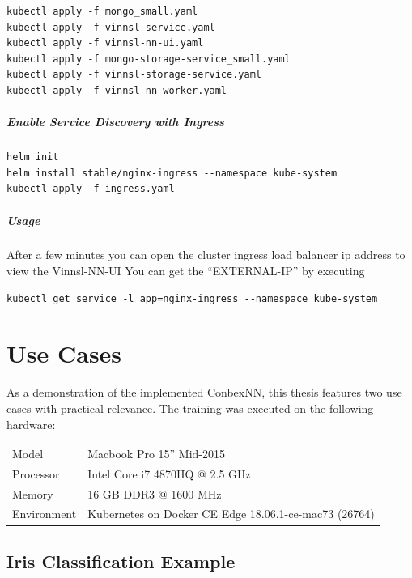 \begin{verbatim}
kubectl apply -f mongo_small.yaml
kubectl apply -f vinnsl-service.yaml
kubectl apply -f vinnsl-nn-ui.yaml
kubectl apply -f mongo-storage-service_small.yaml 
kubectl apply -f vinnsl-storage-service.yaml
kubectl apply -f vinnsl-nn-worker.yaml
\end{verbatim}

\paragraph{Enable Service Discovery with
Ingress}\label{enable-service-discovery-with-ingress}

\begin{verbatim}
helm init
helm install stable/nginx-ingress --namespace kube-system 
kubectl apply -f ingress.yaml
\end{verbatim}

\paragraph{Usage}\label{usage-1}

After a few minutes you can open the cluster ingress load balancer ip
address to view the Vinnsl-NN-UI You can get the ``EXTERNAL-IP'' by
executing

\begin{verbatim}
kubectl get service -l app=nginx-ingress --namespace kube-system
\end{verbatim}

\chapter{Use Cases}\label{use-cases}

As a demonstration of the implemented ConbexNN, this thesis features two
use cases with practical relevance. The training was executed on the
following hardware:

\begin{longtable}[]{@{}ll@{}}
\toprule
Model & Macbook Pro 15'' Mid-2015\tabularnewline
Processor & Intel Core i7 4870HQ @ 2.5 GHz\tabularnewline
Memory & 16 GB DDR3 @ 1600 MHz\tabularnewline
Environment & Kubernetes on Docker CE Edge 18.06.1-ce-mac73
(26764)\tabularnewline
\bottomrule
\end{longtable}

\section{Iris Classification Example}\label{iris-classification-example}

